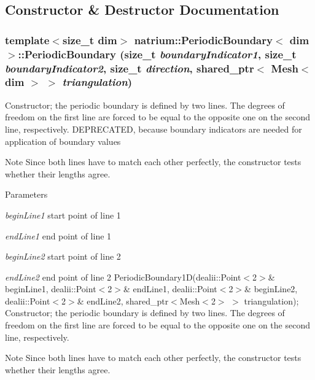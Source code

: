 \subsection{Constructor \& Destructor Documentation}
\hypertarget{classnatrium_1_1PeriodicBoundary_acafd6408c0c450dc2ce657a919aae545}{
\subsubsection[{PeriodicBoundary}]{\setlength{\rightskip}{0pt plus 5cm}template$<$size\_\-t dim$>$ {\bf natrium::PeriodicBoundary}$<$ dim $>$::{\bf PeriodicBoundary} (size\_\-t {\em boundaryIndicator1}, \/  size\_\-t {\em boundaryIndicator2}, \/  size\_\-t {\em direction}, \/  shared\_\-ptr$<$ Mesh$<$ dim $>$ $>$ {\em triangulation})}}
\label{classnatrium_1_1PeriodicBoundary_acafd6408c0c450dc2ce657a919aae545}


Constructor; the periodic boundary is defined by two lines. The degrees of freedom on the first line are forced to be equal to the opposite one on the second line, respectively. DEPRECATED, because boundary indicators are needed for application of boundary values \begin{DoxyNote}{Note}
Since both lines have to match each other perfectly, the constructor tests whether their lengths agree.
\end{DoxyNote}

\begin{DoxyParams}{Parameters}
\item[{\em beginLine1}]start point of line 1 \item[{\em endLine1}]end point of line 1 \item[{\em beginLine2}]start point of line 2 \item[{\em endLine2}]end point of line 2 PeriodicBoundary1D(dealii::Point$<$2$>$\& beginLine1, dealii::Point$<$2$>$\& endLine1, dealii::Point$<$2$>$\& beginLine2, dealii::Point$<$2$>$\& endLine2, shared\_\-ptr$<$Mesh$<$2$>$ $>$ triangulation); Constructor; the periodic boundary is defined by two lines. The degrees of freedom on the first line are forced to be equal to the opposite one on the second line, respectively. \end{DoxyParams}
\begin{DoxyNote}{Note}
Since both lines have to match each other perfectly, the constructor tests whether their lengths agree.
\end{DoxyNote}

